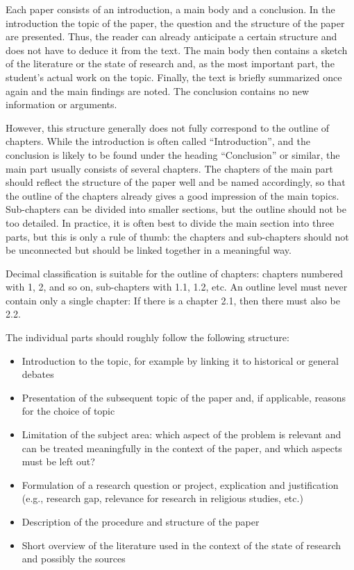 \documentclass[
  english,
]{scrreprt}
\begin{document}
Each paper consists of an introduction, a main body and a conclusion. In the introduction the topic of the paper, the question and the structure of the paper are presented. Thus, the reader can already anticipate a certain structure and does not have to deduce it from the text. The main body then contains a sketch of the literature or the state of research and, as the most important part, the student’s actual work on the topic. Finally, the text is briefly summarized once again and the main findings are noted. The conclusion contains no new information or arguments.

However, this structure generally does not fully correspond to the outline of chapters. While the introduction is often called “Introduction”, and the conclusion is likely to be found under the heading “Conclusion” or similar, the main part usually consists of several chapters. The chapters of the main part should reflect the structure of the paper well and be named accordingly, so that the outline of the chapters already gives a good impression of the main topics. Sub-chapters can be divided into smaller sections, but the outline should not be too detailed. In practice, it is often best to divide the main section into three parts, but this is only a rule of thumb: the chapters and sub-chapters should not be unconnected but should be linked together in a meaningful way.

Decimal classification is suitable for the outline of chapters: chapters numbered with 1, 2, and so on, sub-chapters with 1.1, 1.2, etc. An outline level must never contain only a single chapter: If there is a chapter 2.1, then there must also be 2.2.

The individual parts should roughly follow the following structure:

\begin{itemize}
\item
  Introduction to the topic, for example by linking it to historical or general debates
\item
  Presentation of the subsequent topic of the paper and, if applicable, reasons for the choice of topic
\item
  Limitation of the subject area: which aspect of the problem is relevant and can be treated meaningfully in the context of the paper, and which aspects must be left out?
\item
  Formulation of a research question or project, explication and justification (e.g., research gap, relevance for research in religious studies, etc.)
\item
  Description of the procedure and structure of the paper
\item
  Short overview of the literature used in the context of the state of research and possibly the sources
\end{itemize}
\end{document}
